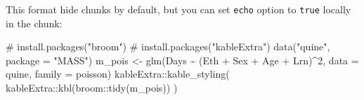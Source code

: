 \documentclass[
]{interact}
\newenvironment{Shaded}{\begin{snugshade}}{\end{snugshade}}
\newcommand{\AttributeTok}[1]{\textcolor[rgb]{0.40,0.45,0.13}{#1}}
\newcommand{\CommentTok}[1]{\textcolor[rgb]{0.37,0.37,0.37}{#1}}
\newcommand{\DecValTok}[1]{\textcolor[rgb]{0.68,0.00,0.00}{#1}}
\newcommand{\FunctionTok}[1]{\textcolor[rgb]{0.28,0.35,0.67}{#1}}
\newcommand{\NormalTok}[1]{\textcolor[rgb]{0.00,0.23,0.31}{#1}}
\newcommand{\OtherTok}[1]{\textcolor[rgb]{0.00,0.23,0.31}{#1}}
\newcommand{\SpecialCharTok}[1]{\textcolor[rgb]{0.37,0.37,0.37}{#1}}
\newcommand{\StringTok}[1]{\textcolor[rgb]{0.13,0.47,0.30}{#1}}
\begin{document}
This format hide chunks by default, but you can set \texttt{echo} option
to \texttt{true} locally in the chunk:

\begin{Shaded}
\begin{Highlighting}[]
\CommentTok{\# install.packages("broom")}
\CommentTok{\# install.packages("kableExtra")}
\FunctionTok{data}\NormalTok{(}\StringTok{"quine"}\NormalTok{, }\AttributeTok{package =} \StringTok{"MASS"}\NormalTok{)}
\NormalTok{m\_pois }\OtherTok{\textless{}{-}} \FunctionTok{glm}\NormalTok{(Days }\SpecialCharTok{\textasciitilde{}}\NormalTok{ (Eth }\SpecialCharTok{+}\NormalTok{ Sex }\SpecialCharTok{+}\NormalTok{ Age }\SpecialCharTok{+}\NormalTok{ Lrn)}\SpecialCharTok{\^{}}\DecValTok{2}\NormalTok{, }\AttributeTok{data =}\NormalTok{ quine, }\AttributeTok{family =}\NormalTok{ poisson)}
\NormalTok{kableExtra}\SpecialCharTok{::}\FunctionTok{kable\_styling}\NormalTok{(}
\NormalTok{  kableExtra}\SpecialCharTok{::}\FunctionTok{kbl}\NormalTok{(broom}\SpecialCharTok{::}\FunctionTok{tidy}\NormalTok{(m\_pois))}
\NormalTok{)}
\end{Highlighting}
\end{Shaded}
\end{document}
